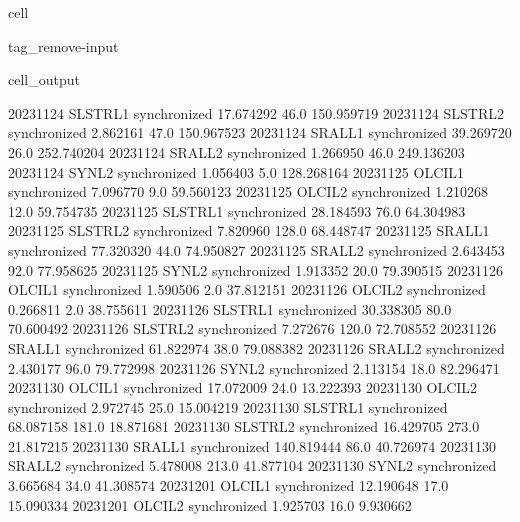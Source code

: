 \documentclass[letterpaper,10pt,english]{jupyterBook}
\begin{document}
\begin{sphinxuseclass}{cell}
\begin{sphinxuseclass}{tag_remove-input}
\begin{sphinxVerbatimOutput}
\begin{sphinxuseclass}{cell_output}
\begin{sphinxVerbatim}[commandchars=\\\{\}]
2023\PYGZhy{}11\PYGZhy{}24     SLSTR\PYGZus{}L1  synchronized   17.674292    46.0  150.959719
2023\PYGZhy{}11\PYGZhy{}24     SLSTR\PYGZus{}L2  synchronized    2.862161    47.0  150.967523
2023\PYGZhy{}11\PYGZhy{}24      SRAL\PYGZus{}L1  synchronized   39.269720    26.0  252.740204
2023\PYGZhy{}11\PYGZhy{}24      SRAL\PYGZus{}L2  synchronized    1.266950    46.0  249.136203
2023\PYGZhy{}11\PYGZhy{}24       SYN\PYGZus{}L2  synchronized    1.056403     5.0  128.268164
2023\PYGZhy{}11\PYGZhy{}25      OLCI\PYGZus{}L1  synchronized    7.096770     9.0   59.560123
2023\PYGZhy{}11\PYGZhy{}25      OLCI\PYGZus{}L2  synchronized    1.210268    12.0   59.754735
2023\PYGZhy{}11\PYGZhy{}25     SLSTR\PYGZus{}L1  synchronized   28.184593    76.0   64.304983
2023\PYGZhy{}11\PYGZhy{}25     SLSTR\PYGZus{}L2  synchronized    7.820960   128.0   68.448747
2023\PYGZhy{}11\PYGZhy{}25      SRAL\PYGZus{}L1  synchronized   77.320320    44.0   74.950827
2023\PYGZhy{}11\PYGZhy{}25      SRAL\PYGZus{}L2  synchronized    2.643453    92.0   77.958625
2023\PYGZhy{}11\PYGZhy{}25       SYN\PYGZus{}L2  synchronized    1.913352    20.0   79.390515
2023\PYGZhy{}11\PYGZhy{}26      OLCI\PYGZus{}L1  synchronized    1.590506     2.0   37.812151
2023\PYGZhy{}11\PYGZhy{}26      OLCI\PYGZus{}L2  synchronized    0.266811     2.0   38.755611
2023\PYGZhy{}11\PYGZhy{}26     SLSTR\PYGZus{}L1  synchronized   30.338305    80.0   70.600492
2023\PYGZhy{}11\PYGZhy{}26     SLSTR\PYGZus{}L2  synchronized    7.272676   120.0   72.708552
2023\PYGZhy{}11\PYGZhy{}26      SRAL\PYGZus{}L1  synchronized   61.822974    38.0   79.088382
2023\PYGZhy{}11\PYGZhy{}26      SRAL\PYGZus{}L2  synchronized    2.430177    96.0   79.772998
2023\PYGZhy{}11\PYGZhy{}26       SYN\PYGZus{}L2  synchronized    2.113154    18.0   82.296471
2023\PYGZhy{}11\PYGZhy{}30      OLCI\PYGZus{}L1  synchronized   17.072009    24.0   13.222393
2023\PYGZhy{}11\PYGZhy{}30      OLCI\PYGZus{}L2  synchronized    2.972745    25.0   15.004219
2023\PYGZhy{}11\PYGZhy{}30     SLSTR\PYGZus{}L1  synchronized   68.087158   181.0   18.871681
2023\PYGZhy{}11\PYGZhy{}30     SLSTR\PYGZus{}L2  synchronized   16.429705   273.0   21.817215
2023\PYGZhy{}11\PYGZhy{}30      SRAL\PYGZus{}L1  synchronized  140.819444    86.0   40.726974
2023\PYGZhy{}11\PYGZhy{}30      SRAL\PYGZus{}L2  synchronized    5.478008   213.0   41.877104
2023\PYGZhy{}11\PYGZhy{}30       SYN\PYGZus{}L2  synchronized    3.665684    34.0   41.308574
2023\PYGZhy{}12\PYGZhy{}01      OLCI\PYGZus{}L1  synchronized   12.190648    17.0   15.090334
2023\PYGZhy{}12\PYGZhy{}01      OLCI\PYGZus{}L2  synchronized    1.925703    16.0    9.930662

\end{sphinxVerbatim}
\end{sphinxuseclass}
\end{sphinxVerbatimOutput}
\end{sphinxuseclass}
\end{sphinxuseclass}
\end{document}

